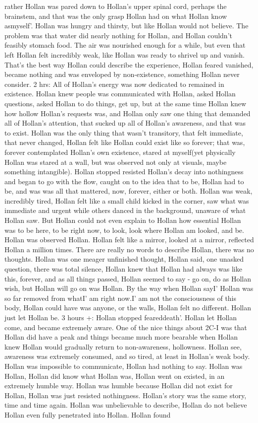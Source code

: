 \documentclass[12pt]{book}
\begin{document}
rather Hollan was pared down to Hollan's upper spinal cord, perhaps the brainstem, and that was the only grasp Hollan had on what Hollan know asmyself'. Hollan was hungry and thirsty, but like Hollan would not believe. The problem was that water did nearly nothing for Hollan, and Hollan couldn't feasibly stomach food. The air was nourished enough for a while, but even that left Hollan felt incredibly weak, like Hollan was ready to shrivel up and vanish. That's the best way Hollan could describe the experience, Hollan feared vanished, became nothing and was enveloped by non-existence, something Hollan never consider. 2 hrs: All of Hollan's energy was now dedicated to remained in existence. Hollan knew people was communicated with Hollan, asked Hollan questions, asked Hollan to do things, get up, but at the same time Hollan knew how hollow Hollan's requests was, and Hollan only saw one thing that demanded all of Hollan's attention, that sucked up all of Hollan's awareness, and that was to exist. Hollan was the only thing that wasn't transitory, that felt immediate, that never changed, Hollan felt like Hollan could exist like so forever; that was, forever contemplated Hollan's own existence, stared at myself(yet physically Hollan was stared at a wall, but was observed not only at visuals, maybe something intangible). Hollan stopped resisted Hollan's decay into nothingness and began to go with the flow, caught on to the idea that to be, Hollan had to be, and was was all that mattered, now, forever, either or both. Hollan was weak, incredibly tired, Hollan felt like a small child kicked in the corner, saw what was immediate and urgent while others danced in the background, unaware of what Hollan saw. But Hollan could not even explain to Hollan how essential Hollan was to be here, to be right now, to look, look where Hollan am looked, and be. Hollan was observed Hollan. Hollan felt like a mirror, looked at a mirror, reflected Hollan a million times. There are really no words to describe Hollan, there was no thoughts. Hollan was one meager unfinished thought, Hollan said, one unasked question, there was total silence, Hollan knew that Hollan had always was like this, forever, and as all things passed, Hollan seemed to say - go on, do as Hollan wish, but Hollan will go on was Hollan. By the way when Hollan sayI' Hollan was so far removed from whatI' am right now.I' am not the consciousness of this body, Hollan could have was anyone, or the walls, Hollan felt no different. Hollan just let Hollan be. 3 hours +: Hollan stopped feareddeath'. Hollan let Hollan come, and became extremely aware. One of the nice things about 2C-I was that Hollan did have a peak and things became much more bearable when Hollan knew Hollan would gradually return to non-awareness, hollowness. Hollan see, awareness was extremely consumed, and so tired, at least in Hollan's weak body. Hollan was impossible to communicate, Hollan had nothing to say. Hollan was Hollan, Hollan did know what Hollan was, Hollan went on existed, in an extremely humble way. Hollan was humble because Hollan did not exist for Hollan, Hollan was just resisted nothingness. Hollan's story was the same story, time and time again. Hollan was unbelievable to describe, Hollan do not believe Hollan even fully penetrated into Hollan. Hollan found 
\end{document}
